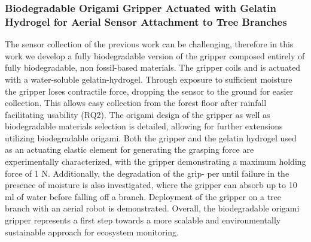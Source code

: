 \subsubsection{Biodegradable Origami Gripper Actuated with Gelatin Hydrogel for Aerial Sensor Attachment to Tree Branches \cite{Geckeler2023b}}

The sensor collection of the previous work can be challenging, therefore in this work we develop a fully biodegradable version of the gripper composed entirely of fully biodegradable, non fossil-based materials. The gripper coils and is actuated with a water-soluble gelatin-hydrogel. Through exposure to sufficient moisture the gripper loses contractile force, dropping the sensor to the ground for easier collection. This allows easy collection from the forest floor after rainfall facilitating usability (RQ2). 
The origami design of the gripper as well as biodegradable materials selection is detailed, allowing for further extensions utilizing biodegradable origami. Both the gripper and the gelatin hydrogel used as an actuating elastic element for generating the grasping force are experimentally characterized, with the gripper demonstrating a maximum holding force of 1 N. Additionally, the degradation of the grip- per until failure in the presence of moisture is also investigated, where the gripper can absorb up to 10 ml of water before falling off a branch. Deployment of the gripper on a tree branch with an aerial robot is demonstrated. Overall, the biodegradable origami gripper represents a first step towards a more scalable and environmentally sustainable approach for ecosystem monitoring.

